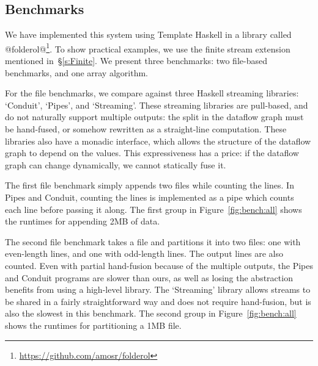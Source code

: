 

\subsection{Benchmarks}
We have implemented this system using Template Haskell in a library called @folderol@\footnote{\url{https://github.com/amosr/folderol}}.
To show practical examples, we use the finite stream extension mentioned in~\S\ref{s:Finite}.
We present three benchmarks: two file-based benchmarks, and one array algorithm.

For the file benchmarks, we compare against three Haskell streaming libraries: `Conduit', `Pipes', and `Streaming'.
These streaming libraries are pull-based, and do not naturally support multiple outputs: the split in the dataflow graph must be hand-fused, or somehow rewritten as a straight-line computation.
These libraries also have a monadic interface, which allows the structure of the dataflow graph to depend on the values. This expressiveness has a price: if the dataflow graph can change dynamically, we cannot statically fuse it.

The first file benchmark simply appends two files while counting the lines.
In Pipes and Conduit, counting the lines is implemented as a pipe which counts each line before passing it along.
The first group in Figure~\ref{fig:bench:all} shows the runtimes for appending 2MB of data.

The second file benchmark takes a file and partitions it into two files: one with even-length lines, and one with odd-length lines.
The output lines are also counted.
Even with partial hand-fusion because of the multiple outputs, the Pipes and Conduit programs are slower than ours, as well as losing the abstraction benefits from using a high-level library.
The `Streaming' library allows streams to be shared in a fairly straightforward way and does not require hand-fusion, but is also the slowest in this benchmark.
The second group in Figure~\ref{fig:bench:all} shows the runtimes for partitioning a 1MB file.


